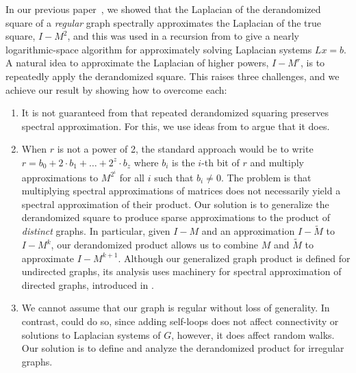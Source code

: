 \documentclass{toc}
\newcommand{\wt}{\widetilde}   %
\numberwithin{myalgctr}{section}
\theoremstyle{named}
\begin{document}
In our previous %
paper~\cite{derandbeyond2017}, we showed that the Laplacian of the derandomized square of a \emph{regular} graph spectrally approximates the Laplacian of the true square, $I-M^2$, and this was used in a recursion from \cite{PS13} to give a nearly logarithmic-space algorithm for approximately solving Laplacian systems $Lx=b$. A natural idea to approximate the Laplacian of higher powers, $I-M^r$, is to repeatedly apply the derandomized square. This raises three challenges, and we achieve our result by showing how to overcome each: 
\begin{enumerate}
\item It is not guaranteed from \cite{derandbeyond2017} that repeated derandomized squaring preserves spectral approximation. For this, we use ideas from \cite{cheng2015} to argue that it does.
\item When $r$ is not a power of 2, the standard approach would be to write $r=b_0+2\cdot b_1+\ldots+2^z\cdot b_z$ where $b_i$ is the $i$-th bit of $r$ and multiply approximations to $M^{2^{i}}$ for all $i$ such that $b_i\neq 0$. The problem is that multiplying spectral approximations of matrices does not necessarily yield a spectral approximation of their product. Our solution is to generalize the derandomized square to produce sparse approximations to the product of \emph{distinct} graphs. In particular, given $I-M$ and an approximation $I-\wt{M}$ to $I-M^k$, our derandomized product allows us to combine $M$ and $\wt{M}$ to approximate $I-M^{k+1}$. Although our generalized graph product is defined for undirected graphs, its analysis uses machinery for spectral approximation of directed graphs, introduced in \cite{CKPPRSV16}.
\item We cannot assume that our graph is regular without loss of generality. In contrast, \cite{Reingold08,RozenmanVa05,derandbeyond2017} could do so, since adding self-loops does not affect connectivity or solutions to Laplacian systems of $G$, however, it does affect random walks. Our solution is to define and analyze the derandomized product for irregular graphs.
\end{enumerate}
\end{document}
